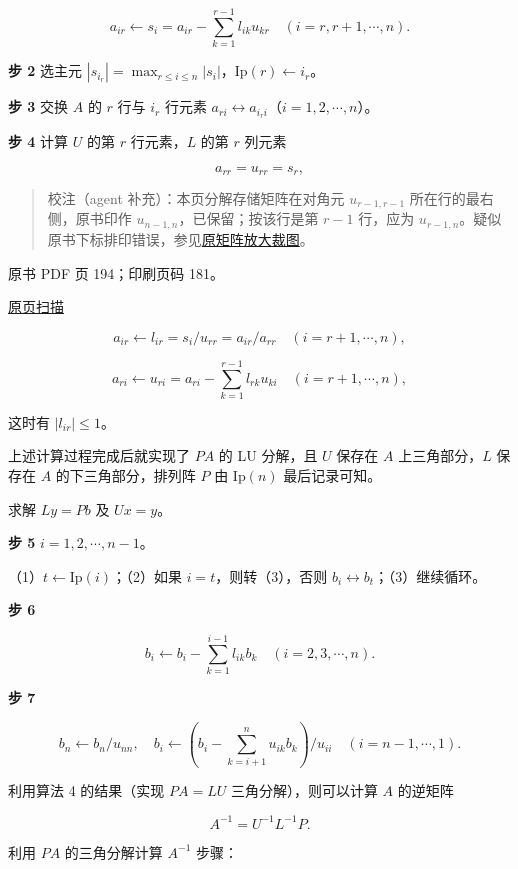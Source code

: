 \[a_{ir}\leftarrow s_i=a_{ir}-\sum_{k=1}^{r-1}l_{ik}u_{kr}\quad(i=r,r+1,\cdots,n).\]

\textbf{步 2} 选主元 \(|s_{i_r}|=\max_{r\le i\le n}|s_i|\)，\(\mathrm{Ip}(r)\leftarrow i_r\)。

\textbf{步 3} 交换 \(A\) 的 \(r\) 行与 \(i_r\) 行元素 \(a_{ri}\leftrightarrow a_{i_ri}\)（\(i=1,2,\cdots,n\)）。

\textbf{步 4} 计算 \(U\) 的第 \(r\) 行元素，\(L\) 的第 \(r\) 列元素

\[a_{rr}=u_{rr}=s_r,\]

\begin{quote}
校注（agent 补充）：本页分解存储矩阵在对角元 \(u_{r-1,r-1}\) 所在行的最右侧，原书印作 \(u_{n-1,n}\)，已保留；按该行是第 \(r-1\) 行，应为 \(u_{r-1,n}\)。疑似原书下标排印错误，参见\href{verified/assets/ch07a/pdf-193-storage-detail.png}{原矩阵放大裁图}。
\end{quote}

\clearpage

原书 PDF 页 194；印刷页码 181。

\href{source-images/pdf-194.jpeg}{原页扫描}

\[a_{ir}\leftarrow l_{ir}=s_i/u_{rr}=a_{ir}/a_{rr}\quad(i=r+1,\cdots,n),\]

\[a_{ri}\leftarrow u_{ri}=a_{ri}-\sum_{k=1}^{r-1}l_{rk}u_{ki}\quad(i=r+1,\cdots,n),\]

这时有 \(|l_{ir}|\le1\)。

上述计算过程完成后就实现了 \(PA\) 的 LU 分解，且 \(U\) 保存在 \(A\) 上三角部分，\(L\) 保存在 \(A\) 的下三角部分，排列阵 \(P\) 由 \(\mathrm{Ip}(n)\) 最后记录可知。

求解 \(Ly=Pb\) 及 \(Ux=y\)。

\textbf{步 5} \(i=1,2,\cdots,n-1\)。

（1）\(t\leftarrow\mathrm{Ip}(i)\)；（2）如果 \(i=t\)，则转（3），否则 \(b_i\leftrightarrow b_t\)；（3）继续循环。

\textbf{步 6}

\[b_i\leftarrow b_i-\sum_{k=1}^{i-1}l_{ik}b_k\quad(i=2,3,\cdots,n).\]

\textbf{步 7}

\[b_n\leftarrow b_n/u_{nn},\quad b_i\leftarrow\left(b_i-\sum_{k=i+1}^{n}u_{ik}b_k\right)/u_{ii}\quad(i=n-1,\cdots,1).\]

利用算法 4 的结果（实现 \(PA=LU\) 三角分解），则可以计算 \(A\) 的逆矩阵

\[A^{-1}=U^{-1}L^{-1}P.\]

利用 \(PA\) 的三角分解计算 \(A^{-1}\) 步骤：

